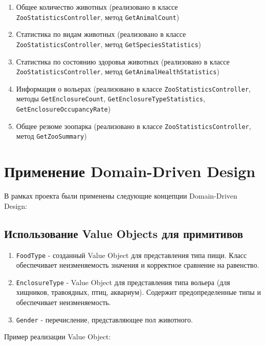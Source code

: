 \documentclass[a4paper,12pt]{article}
\begin{document}
\begin{enumerate}
    \item Общее количество животных (реализовано в классе \texttt{ZooStatisticsController}, метод \texttt{GetAnimalCount})
    \item Статистика по видам животных (реализовано в классе \texttt{ZooStatisticsController}, метод \texttt{GetSpeciesStatistics})
    \item Статистика по состоянию здоровья животных (реализовано в классе \texttt{ZooStatisticsController}, метод \texttt{GetAnimalHealthStatistics})
    \item Информация о вольерах (реализовано в классе \texttt{ZooStatisticsController}, методы \texttt{GetEnclosureCount}, \texttt{GetEnclosureTypeStatistics}, \texttt{GetEnclosureOccupancyRate})
    \item Общее резюме зоопарка (реализовано в классе \texttt{ZooStatisticsController}, метод \texttt{GetZooSummary})
\end{enumerate}

\section{Применение Domain-Driven Design}

В рамках проекта были применены следующие концепции Domain-Driven Design:

\subsection{Использование Value Objects для примитивов}

\begin{enumerate}
    \item \texttt{FoodType} - созданный Value Object для представления типа пищи. Класс обеспечивает неизменяемость значения и корректное сравнение на равенство.
    \item \texttt{EnclosureType} - Value Object для представления типа вольера (для хищников, травоядных, птиц, аквариум). Содержит предопределенные типы и обеспечивает неизменяемость.
    \item \texttt{Gender} - перечисление, представляющее пол животного.
\end{enumerate}

Пример реализации Value Object:
\end{document}
